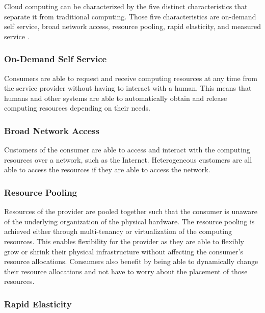 \documentclass[fullapage,12pt]{article}
\begin{document}
Cloud computing can be characterized by the five distinct characteristics that separate it from traditional computing. Those five characteristics are on-demand self service, broad network access, resource pooling, rapid elasticity, and measured service \cite{alam2015comprehensive, dillon2010cloud}.

\subsubsection{On-Demand Self Service} \label{ssub:on-demand}

Consumers are able to request and receive computing resources at any time from the service provider without having to interact with a human. This means that humans and other systems are able to automatically obtain and release computing resources depending on their needs.


\subsubsection{Broad Network Access} \label{ssub:net-access}

Customers of the consumer are able to access and interact with the computing resources over a network, such as the Internet. Heterogeneous customers are all able to access the resources if they are able to access the network.


\subsubsection{Resource Pooling} \label{ssub:resource-pooling}

Resources of the provider are pooled together such that the consumer is unaware of the underlying organization of the physical hardware. The resource pooling is achieved either through multi-tenancy or virtualization of the computing resources. This enables flexibility for the provider as they are able to flexibly grow or shrink their physical infrastructure without affecting the consumer's resource allocations. Consumers also benefit by being able to dynamically change their resource allocations and not have to worry about the placement of those resources.


\subsubsection{Rapid Elasticity} \label{ssub:elasticity}
\end{document}
